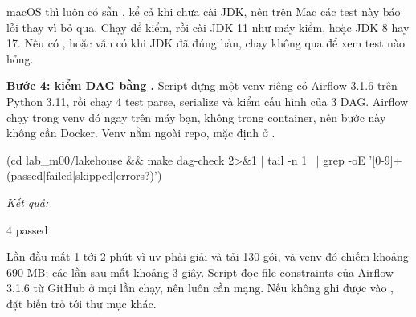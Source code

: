 macOS thì luôn có sẵn , kể cả khi chưa cài JDK, nên trên Mac các test này báo lỗi thay vì bỏ qua. Chạy  để kiểm, rồi cài JDK 11 như máy kiểm, hoặc JDK 8 hay 17. Nếu có , hoặc vẫn có  khi JDK đã đúng bản, chạy  không qua  để xem test nào hỏng.

\textbf{Bước 4: kiểm DAG bằng .} Script  dựng một venv riêng có Airflow 3.1.6 trên Python 3.11, rồi chạy 4 test parse, serialize và kiểm cấu hình của 3 DAG. Airflow chạy trong venv đó ngay trên máy bạn, không trong container, nên bước này không cần Docker. Venv nằm ngoài repo, mặc định ở .

\begin{codeblock}
(cd lab_m00/lakehouse && make dag-check 2>&1 | tail -n 1 \
  | grep -oE '[0-9]+ (passed|failed|skipped|errors?)')
\end{codeblock}
\textit{Kết quả:}
\begin{codeblock}
4 passed
\end{codeblock}

Lần đầu mất 1 tới 2 phút vì uv phải giải và tải 130 gói, và venv đó chiếm khoảng 690 MB; các lần sau mất khoảng 3 giây. Script đọc file constraints của Airflow 3.1.6 từ GitHub ở mọi lần chạy, nên luôn cần mạng. Nếu không ghi được vào , đặt biến  trỏ tới thư mục khác.

